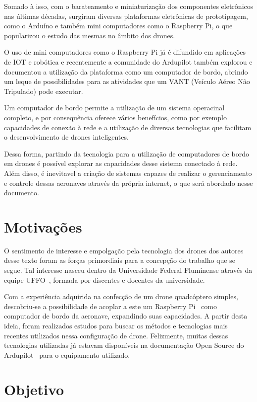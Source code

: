 \documentclass[12pt,a4paper,oneside]{book}
\begin{document}
Somado à isso, com o barateamento e miniaturização dos componentes eletrônicos nas últimas décadas, surgiram diversas plataformas eletrônicas de prototipagem, como o Arduíno e também mini computadores como o Raspberry Pi, o que popularizou o estudo das mesmas no âmbito dos drones. 

O uso de mini computadores como o Raspberry Pi já é difundido em aplicações de IOT e robótica e recentemente a comunidade do Ardupilot também explorou e documentou a utilização da plataforma como um computador de bordo, abrindo um leque de possibilidades para as atividades que um VANT (Veículo Aéreo Não Tripulado) pode executar. 

Um computador de bordo permite a utilização de um sistema operacinal completo, e por consequência oferece vários benefícios, como por exemplo capacidades de conexão à rede e a utilização de diversas tecnologias que facilitam o desenvolvimento de drones inteligentes.

Dessa forma, partindo da tecnologia para a utilização de computadores de bordo em drones é possível explorar as capacidades desse sistema conectado à rede. Além disso, é inevitavel a criação de sistemas capazes de realizar o gerenciamento e controle dessas aeronaves através da própria internet, o que será abordado nesse documento.

\section{Motivações}

O sentimento de interesse e empolgação pela tecnologia dos drones dos autores desse texto foram as forças primordiais para a concepção 
do trabalho que se segue. Tal interesse nasceu dentro da Universidade Federal Fluminense através da equipe UFFO~\cite{url:equipeuffo}, 
formada por discentes e docentes da universidade.

Com a experiência adquirida na confecção de um drone quadcóptero simples, descobriu-se a possibilidade de acoplar a este um 
Raspberry Pi~\cite{url:raspberrypi} como computador de bordo da aeronave, expandindo suas capacidades. A partir desta ideia, foram realizados estudos para buscar os métodos e tecnologias mais recentes utilizados nessa configuração de drone. 
Felizmente, muitas dessas tecnologias utilizadas já estavam disponíveis na documentação Open Source do Ardupilot~\cite{url:ardupilotdoc} 
para o equipamento utilizado.

\section{Objetivo}
\end{document}
